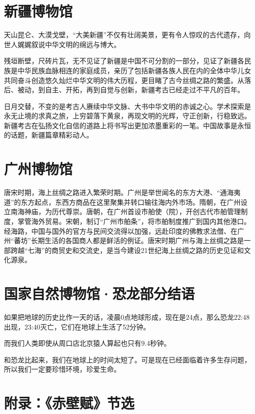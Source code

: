 \newpage

\section*{新疆博物馆}

天山昆仑、大漠戈壁，“大美新疆”不仅有壮阔美景，更有令人惊叹的古代遗存，向世人娓娓叙说中华文明的绵远与博大。

残垣断壁，尺砖片瓦，无不见证了新疆是中国不可分割的一部分，见证了新疆各民族是中华民族血脉相连的家庭成员，亲历了包括新疆各族人民在内的全体中华儿女共同奋斗创造悠久灿烂中华文明的伟大历程，更目睹了古今丝绸之路的繁盛。从落后、被动，到自主、开拓，再到自觉与创新，新疆考古已经走过不平凡的百年。

日月交替，不变的是考古人赓续中华文脉、大书中华文明的赤诚之心。学术探索是永无止境的求真之旅，上穷碧落下黄泉，再现文明的光辉，守正创新，行稳致远。新疆考古在弘扬文化自信的道路上将书写出更加浓墨重彩的一笔。中国故事是永恒的话题，新疆篇章精彩动人。

\newpage

\section*{广州博物馆}

唐宋时期，海上丝绸之路进入繁荣时期。广州是举世闻名的东方大港、“通海夷道”的东方起点，东西方商品在这里聚集并转口输往海内外市场。隋朝，在广州设立南海神庙，为历代尊崇。唐朝，在广州首设市舶使（院），开创古代市舶管理制度，掌管海外贸易。宋朝，制订“广州市舶条”，将市舶制度推广到国内其他港口。经海路，中国与国外的官方与民间交流得以加强，远赴印度的佛教求法僧、在广州“蕃坊”长期生活的各国商人都是鲜活的例证。唐宋时期广州与海上丝绸之路是一部跨越“七海”的商贸史和交流史，是当今建设21世纪海上丝绸之路的历史见证和文化源泉。

\newpage

\section*{国家自然博物馆·恐龙部分结语}

如果把地球的历史比作一天的话，凌晨0点地球形成，现在是24点，那么恐龙22:48出现，23:40灭亡，它们在地球上生活了52分钟。

而我们人类即使从周口店北京猿人算起也只有9.4秒钟。

和恐龙比起来，我们在地球上的时间太短了。可是现在已经面临着许多生存问题，所以我们一定要珍惜环境，珍爱生命。

\newpage

\section*{附录：《赤壁赋》节选}

